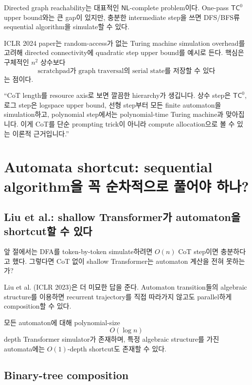 \documentclass[11pt,a4paper,oneside,openany]{memoir}
\theoremstyle{definition}
\newcommand{\TC}{\mathsf{TC}}
\newcommand{\NL}{\mathsf{NL}}
\begin{document}
Directed graph reachability는 대표적인 $\NL$-complete problem이다.
One-pass $\TC^0$ upper bound와는 큰 gap이 있지만, 충분한 intermediate step을 쓰면 DFS/BFS류 sequential algorithm을 simulate할 수 있다.

ICLR 2024 paper는 random-access가 없는 Turing machine simulation overhead를 고려해 directed connectivity에 quadratic step upper bound를 예시로 든다.
핵심은 구체적인 $n^2$ 상수보다
\[
\text{scratchpad가 graph traversal의 serial state를 저장할 수 있다}
\]
는 점이다.

\begin{presentbox}
``CoT length를 resource axis로 보면 깔끔한 hierarchy가 생깁니다. 상수 step은 $\TC^0$, 로그 step은 logspace upper bound, 선형 step부터 모든 finite automaton을 simulation하고, polynomial step에서는 polynomial-time Turing machine과 맞아집니다. 이게 CoT를 단순 prompting trick이 아니라 compute allocation으로 볼 수 있는 이론적 근거입니다.''
\end{presentbox}

\chapter{Automata shortcut: sequential algorithm을 꼭 순차적으로 풀어야 하나?}

\section{Liu et al.: shallow Transformer가 automaton을 shortcut할 수 있다}

앞 절에서는 DFA를 token-by-token simulate하려면 $O(n)$ CoT step이면 충분하다고 했다.
그렇다면 CoT 없이 shallow Transformer는 automaton 계산을 전혀 못하는가?

Liu et al. (ICLR 2023)은 더 미묘한 답을 준다.
Automaton transition들의 algebraic structure를 이용하면 recurrent trajectory를 직접 따라가지 않고도 parallel하게 composition할 수 있다.

모든 automaton에 대해 polynomial-size
\[
O(\log n)
\]
depth Transformer simulator가 존재하며, 특정 algebraic structure를 가진 automata에는 $O(1)$-depth shortcut도 존재할 수 있다.

\section{Binary-tree composition}
\end{document}
